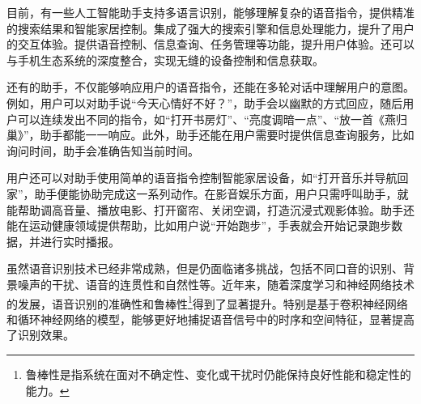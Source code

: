 
目前，有一些人工智能助手支持多语言识别，能够理解复杂的语音指令，提供精准的搜索结果和智能家居控制。集成了强大的搜索引擎和信息处理能力，提升了用户的交互体验。提供语音控制、信息查询、任务管理等功能，提升用户体验。还可以与手机生态系统的深度整合，实现无缝的设备控制和信息获取。

还有的助手，不仅能够响应用户的语音指令，还能在多轮对话中理解用户的意图。例如，用户可以对助手说“今天心情好不好？”，助手会以幽默的方式回应，随后用户可以连续发出不同的指令，如“打开书房灯”、“亮度调暗一点”、“放一首《燕归巢》”，助手都能一一响应。此外，助手还能在用户需要时提供信息查询服务，比如询问时间，助手会准确告知当前时间。

用户还可以对助手使用简单的语音指令控制智能家居设备，如“打开音乐并导航回家”，助手便能协助完成这一系列动作。在影音娱乐方面，用户只需呼叫助手，就能帮助调高音量、播放电影、打开窗帘、关闭空调，打造沉浸式观影体验。助手还能在运动健康领域提供帮助，比如用户说“开始跑步”，手表就会开始记录跑步数据，并进行实时播报。


虽然语音识别技术已经非常成熟，但是仍面临诸多挑战，包括不同口音的识别、背景噪声的干扰、语音的连贯性和自然性等。近年来，随着深度学习和神经网络技术的发展，语音识别的准确性和鲁棒性\footnote{鲁棒性是指系统在面对不确定性、变化或干扰时仍能保持良好性能和稳定性的能力。}得到了显著提升。特别是基于卷积神经网络和循环神经网络的模型，能够更好地捕捉语音信号中的时序和空间特征，显著提高了识别效果。

